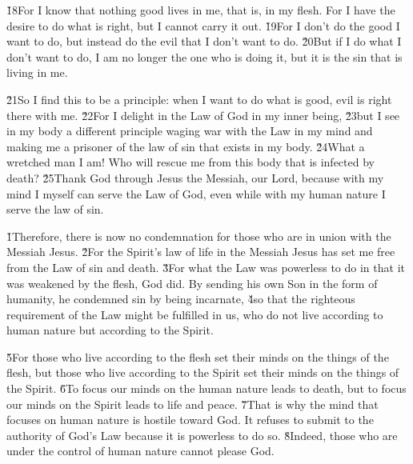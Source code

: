 \v{18}For I know that nothing good lives in me, that is, in my flesh. For I have the desire to do what is right, but I cannot carry it out. \v{19}For I don't do the good I want to do, but instead do the evil that I don't want to do. \v{20}But if I do what I don't want to do, I am no longer the one who is doing it, but it is the sin that is living in me.

\v{21}So I find this to be a principle: when I want to do what is good, evil is right there with me. \v{22}For I delight in the Law of God in my inner being, \v{23}but I see in my body a different principle waging war with the Law in my mind and making me a prisoner of the law of sin that exists in my body. \v{24}What a wretched man I am! Who will rescue me from this body that is infected by death? \v{25}Thank God through Jesus the Messiah, our Lord, because with my mind I myself can serve the Law of God, even while with my human nature I serve the law of sin.

\v{1}Therefore, there is now no condemnation for those who are in union with the Messiah Jesus. \v{2}For the Spirit's law of life in the Messiah Jesus has set me free from the Law of sin and death. \v{3}For what the Law was powerless to do in that it was weakened by the flesh, God did. By sending his own Son in the form of humanity, he condemned sin by being incarnate, \v{4}so that the righteous requirement of the Law might be fulfilled in us, who do not live according to human nature but according to the Spirit.

\v{5}For those who live according to the flesh set their minds on the things of the flesh, but those who live according to the Spirit set their minds on the things of the Spirit. \v{6}To focus our minds on the human nature leads to death, but to focus our minds on the Spirit leads to life and peace. \v{7}That is why the mind that focuses on human nature is hostile toward God. It refuses to submit to the authority of God's Law because it is powerless to do so. \v{8}Indeed, those who are under the control of human nature cannot please God.

